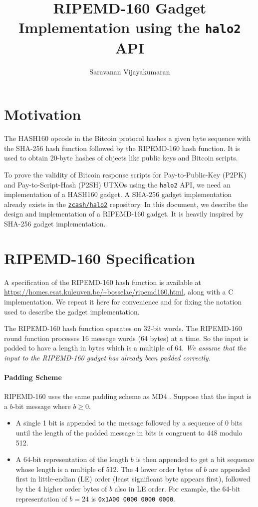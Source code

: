 \documentclass[10pt]{article}
\title{RIPEMD-160 Gadget Implementation using the \texttt{halo2} API}
\author{Saravanan Vijayakumaran}
\begin{document}
\maketitle
  
\section{Motivation}%
\label{sec:motivation}
The HASH160 opcode in the Bitcoin protocol hashes a given byte sequence with the SHA-256 hash function followed by the RIPEMD-160 hash function. It is used to obtain 20-byte hashes of objects like public keys and Bitcoin scripts.

To prove the validity of Bitcoin response scripts for Pay-to-Public-Key (P2PK) and Pay-to-Script-Hash (P2SH) UTXOs using the \texttt{halo2} API, we need an implementation of a HASH160 gadget.
A SHA-256 gadget implementation already exists in the \href{https://github.com/zcash/halo2/tree/main/halo2_gadgets/src}{\texttt{zcash/halo2}} repository. In this document, we describe the design and implementation of a RIPEMD-160 gadget. It is heavily inspired by SHA-256 gadget implementation.

\section{RIPEMD-160 Specification}%
\label{sec:ripemd160_specification}
A specification of the RIPEMD-160 hash function is available at \url{https://homes.esat.kuleuven.be/~bosselae/ripemd160.html}, along with a C implementation. We repeat it here for convenience and for fixing the notation used to describe the gadget implementation. 

The RIPEMD-160 hash function operates on 32-bit words. The RIPEMD-160 round function processes 16 message words (64 bytes) at a time. So the input is padded to have a length in bytes which is a multiple of 64. \textit{We assume that the input to the RIPEMD-160 gadget has already been padded correctly.}

\paragraph{Padding Scheme} RIPEMD-160 uses the same padding scheme as MD4 \cite{MD4Digest}. Suppose that the input is a $b$-bit message where $b \ge 0$.
\begin{itemize}
  \item A single 1 bit is appended to the message followed by a sequence of 0 bits until the length of the padded message in bits is congruent to 448 modulo 512.
  \item A 64-bit representation of the length $b$ is then appended to get a bit sequence whose length is a multiple of 512. The 4 lower order bytes of $b$ are appended first in little-endian (LE) order (least significant byte appears first), followed by the 4 higher order bytes of $b$ also in LE order. For example, the 64-bit representation of $b=24$ is \texttt{0x1A00 0000 0000 0000}.
\end{itemize}
\end{document}
